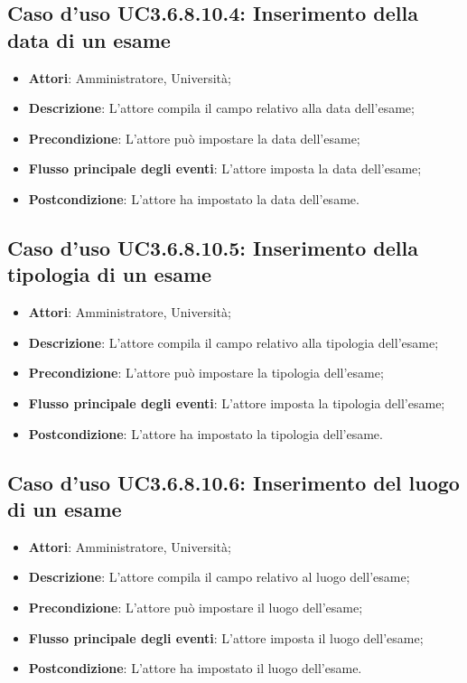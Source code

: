 \subsection{Caso d'uso \texorpdfstring{UC3.6.8.10.4}{UC3.6.8.10.4}: Inserimento della data di un esame}
\begin{itemize}
\item \textbf{Attori}: Amministratore, Università;
\item \textbf{Descrizione}: L'attore compila il campo relativo alla data dell’esame;

\item \textbf{Precondizione}: L'attore può impostare la data dell’esame;

\item \textbf{Flusso principale degli eventi}: L'attore imposta la data dell’esame;

\item \textbf{Postcondizione}: L'attore ha impostato la data dell’esame.

\end{itemize}
\subsection{Caso d'uso \texorpdfstring{UC3.6.8.10.5}{UC3.6.8.10.5}: Inserimento della tipologia di un esame}
\begin{itemize}
\item \textbf{Attori}: Amministratore, Università;
\item \textbf{Descrizione}: L'attore compila il campo relativo alla tipologia dell’esame;

\item \textbf{Precondizione}: L'attore può impostare la tipologia dell’esame;

\item \textbf{Flusso principale degli eventi}: L'attore imposta la tipologia dell’esame;

\item \textbf{Postcondizione}: L'attore ha impostato la tipologia dell’esame.

\end{itemize}
\subsection{Caso d'uso \texorpdfstring{UC3.6.8.10.6}{UC3.6.8.10.6}: Inserimento del luogo di un esame}
\begin{itemize}
\item \textbf{Attori}: Amministratore, Università;
\item \textbf{Descrizione}: L'attore compila il campo relativo al luogo dell’esame;

\item \textbf{Precondizione}: L'attore può impostare il luogo dell’esame;

\item \textbf{Flusso principale degli eventi}: L'attore imposta il luogo dell’esame;

\item \textbf{Postcondizione}: L'attore ha impostato il luogo dell’esame.

\end{itemize}
